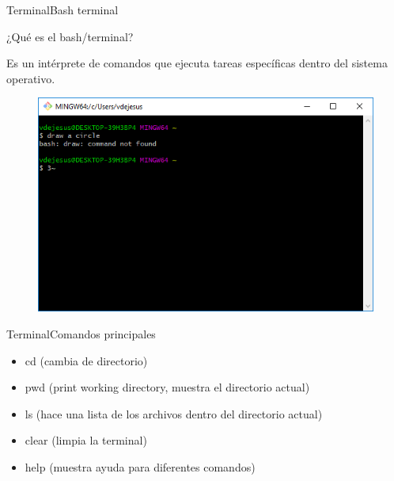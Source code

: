 \documentclass[10pt]{beamer}
\begin{document}
\begin{frame}{Terminal}{Bash terminal}
\begin{block}{¿Qué es el bash/terminal?}

Es un intérprete de comandos que ejecuta tareas específicas dentro del sistema operativo.

\begin{figure}[h!]
\centering
\includegraphics [scale=0.45]{bash}
\label{fig:bash}
\end{figure}

    
\end{block}

\end{frame}

\begin{frame}{Terminal}{Comandos principales}

\begin{block}{}

\begin{itemize}
        \item cd (cambia de directorio)
        \item pwd (print working directory, muestra el directorio actual)
        \item ls (hace una lista de los archivos dentro del directorio actual)
        \item clear (limpia la terminal)
        \item help (muestra ayuda para diferentes comandos)
\end{itemize}
    
\end{block}

\end{frame}
\end{document}

